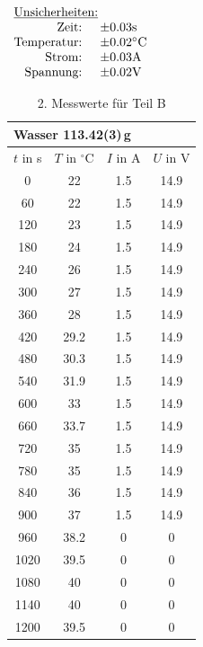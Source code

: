 \documentclass[11pt,a4paper]{article}
\begin{document}
\begin{table}[p]
\centering
$\begin{array}{rl}
\multicolumn{2}{l}{\textrm{\underline{Unsicherheiten:}}}\\
\textrm{Zeit: } & \pm 0.03 \textrm{s}\\
\textrm{Temperatur: } & \pm 0.02 \textrm{\celsius}\\
\textrm{Strom: } & \pm 0.03 \textrm{A}\\
\textrm{Spannung: } & \pm 0.02 \textrm{V}
\end{array}$
\begin{tabular}{|c|c|c|c|}
\multicolumn{4}{l}{Wasser 113.42(3)\,g}\\
\hline
$t$ in s & $T$ in $^\circ\textrm{C}$ & $I$ in A & $U$ in V \\
\hline 
0   & 22 & 1.5 & 14.9\\
60  & 22 & 1.5 & 14.9\\
120 & 23 & 1.5 & 14.9\\
180 & 24 & 1.5 & 14.9\\
240 & 26 & 1.5 & 14.9\\ 
300 & 27 & 1.5 & 14.9\\ 
360 & 28 & 1.5 & 14.9\\ 
420 & 29.2 & 1.5 & 14.9\\ 
480 & 30.3 & 1.5 & 14.9\\ 
540 & 31.9 & 1.5 & 14.9\\ 
600 & 33 & 1.5 & 14.9\\ 
660 & 33.7 & 1.5 & 14.9\\ 
720 & 35 & 1.5 & 14.9\\ 
780 & 35 & 1.5 & 14.9\\ 
840 & 36 & 1.5 &14.9\\
900 & 37 & 1.5 & 14.9\\
960 & 38.2 & 0 & 0\\
1020 & 39.5 & 0 & 0\\
1080 & 40 & 0 & 0\\
1140 & 40 & 0 & 0\\
1200 & 39.5 & 0 & 0\\
\hline
\end{tabular}
\renewcommand\thetable{T5}
\caption{2. Messwerte für Teil B}
\label{tab:B2}
\end{table}
\end{document}
